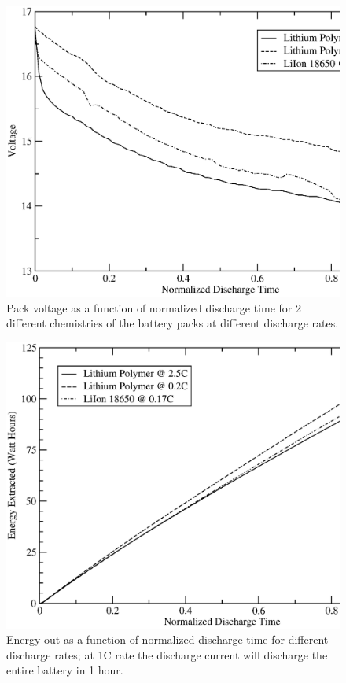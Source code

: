 \documentclass{ifacconf}
\begin{document}
\begin{figure}[tpb]
  \centering
  \includegraphics[scale=0.3]{Figures/V_versus_T.eps}
  \caption{Pack voltage as a function of normalized discharge time for 2 different chemistries of the battery packs at different discharge rates.}
  \label{fig:Batt_v_vs_t}
\end{figure}
\begin{figure}[tpb]
  \centering
  \includegraphics[scale=0.3]{Figures/Energy_v_time.eps}
  \caption{Energy-out as a function of normalized discharge time for different discharge rates; at 1C rate the discharge current will discharge the entire battery in 1 hour.}
  \label{fig:Batt_e_vs_t}
\end{figure}
\end{document}
